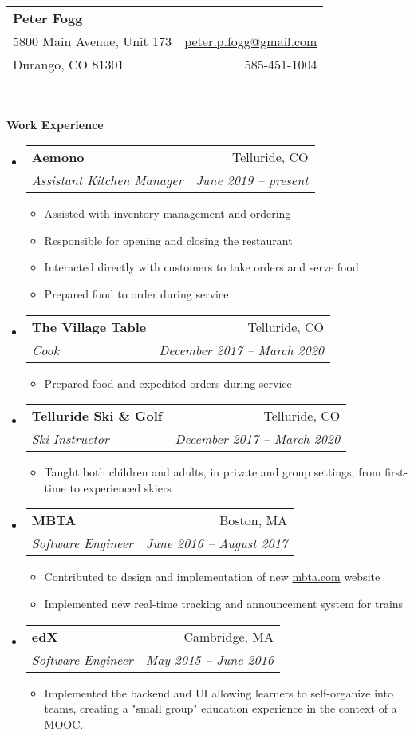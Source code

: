 \documentclass[letterpaper,11pt]{article}
\makeatletter
\newcommand{\resitem}[1]{\item #1 \vspace{-2pt}}
\newcommand{\resheading}[1]{{\large{\begin{minipage}{\textwidth}{\textbf{#1\vphantom{p\^{E}}}}\end{minipage}}}}
\newcommand{\ressubheading}[4]{
  \begin{tabular*}{6.5in}{l@{\extracolsep{\fill}}r}
    \textbf{#1} & #2 \\
    \textit{#3} & \textit{#4} \\
  \end{tabular*}\vspace{-6pt}}
\makeatother
\begin{document}
\newcommand{\mywebheader}{
  \begin{tabular*}{7in}{l@{\extracolsep{\fill}}r}
    \textbf{\LARGE Peter Fogg} & \\
    5800 Main Avenue, Unit 173 &  \href{mailto:peter.p.fogg@gmail.com}{peter.p.fogg@gmail.com} \\
    Durango, CO 81301 & 585-451-1004
  \end{tabular*}
  \\
  \vspace{0.1in}}

\mywebheader

\resheading{Work Experience}
\begin{itemize}
\item
  \ressubheading{Aemono}{Telluride, CO}{Assistant Kitchen Manager}{June 2019 -- present}
  \begin{itemize}
    \resitem{Assisted with inventory management and ordering}
    \resitem{Responsible for opening and closing the restaurant}
    \resitem{Interacted directly with customers to take orders and serve food}
    \resitem{Prepared food to order during service}
  \end{itemize}
\item
  \ressubheading{The Village Table}{Telluride, CO}{Cook}{December 2017 -- March 2020}
  \begin{itemize}
    \resitem{Prepared food and expedited orders during service}
  \end{itemize}
\item
  \ressubheading{Telluride Ski \& Golf}{Telluride, CO}{Ski Instructor}{December 2017 -- March 2020}
  \begin{itemize}
    \resitem{Taught both children and adults, in private and group settings, from first-time to experienced skiers}
  \end{itemize}
\item
  \ressubheading{MBTA}{Boston, MA}{Software Engineer}{June 2016 -- August 2017}
  \begin{itemize}
    \resitem{Contributed to design and implementation of new \href{https://mbta.com/}{mbta.com} website}
    \resitem{Implemented new real-time tracking and announcement system for trains}
  \end{itemize}
\item
  \ressubheading{edX}{Cambridge, MA}{Software Engineer}{May 2015 -- June 2016}
  \begin{itemize}
    \resitem{Implemented the backend and UI allowing learners to self-organize into teams, creating a "small group" education experience in the context of a MOOC.}

\end{itemize}
\end{itemize}
\end{document}
